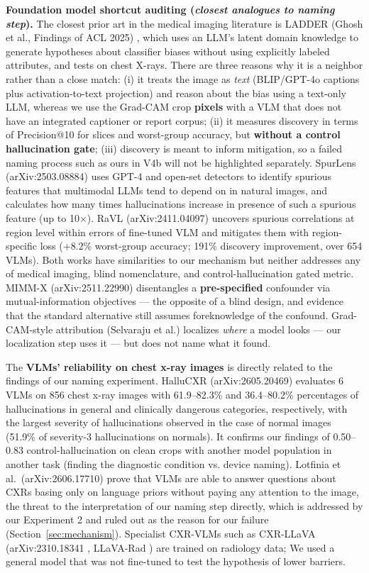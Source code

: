 \documentclass{ieeeaccess}
\begin{document}
\textbf{Foundation model shortcut auditing (\textit{closest analogues to naming step}).} The closest prior art in the medical imaging literature is LADDER (Ghosh et al., Findings of ACL 2025) \cite{ladder}, which uses an LLM's latent domain knowledge to generate hypotheses about classifier biases without using explicitly labeled attributes, and tests on chest X-rays. There are three reasons why it is a neighbor rather than a close match: (i) it treats the image as \emph{text} (BLIP/GPT-4o captions plus activation-to-text projection) and reason about the bias using a text-only LLM, whereas we use the Grad-CAM crop \textbf{pixels} with a VLM that does not have an integrated captioner or report corpus; (ii) it measures discovery in terms of Precision@10 for slices and worst-group accuracy, but \textbf{without a control hallucination gate}; (iii) discovery is meant to inform mitigation, so a failed naming process such as ours in V4b will not be highlighted separately. SpurLens (arXiv:2503.08884) \cite{spurlens} uses GPT-4 and open-set detectors to identify spurious features that multimodal LLMs tend to depend on in natural images, and calculates how many times hallucinations increase in presence of such a spurious feature (up to 10$\times$). RaVL (arXiv:2411.04097) \cite{ravl} uncovers spurious correlations at region level within errors of fine-tuned VLM and mitigates them with region-specific loss ($+8.2\%$ worst-group accuracy; 191\% discovery improvement, over 654 VLMs). Both works have similarities to our mechanism but neither addresses any of medical imaging, blind nomenclature, and control-hallucination gated metric. MIMM-X (arXiv:2511.22990) \cite{mimmx} disentangles a \textbf{pre-specified} confounder via mutual-information objectives --- the opposite of a blind design, and evidence that the standard alternative still assumes foreknowledge of the confound. Grad-CAM-style attribution (Selvaraju et al.) \cite{gradcam} localizes \emph{where} a model looks --- our localization step uses it --- but does not name what it found.

The \textbf{VLMs' reliability on chest x-ray images} is directly related to the findings of our naming experiment. HalluCXR (arXiv:2605.20469) \cite{hallucxr} evaluates 6 VLMs on 856 chest x-ray images with 61.9--82.3\% and 36.4--80.2\% percentages of hallucinations in general and clinically dangerous categories, respectively, with the largest severity of hallucinations observed in the case of normal images (51.9\% of severity-3 hallucinations on normals). It confirms our findings of 0.50--0.83 control-hallucination on clean crops with another model population in another task (finding the diagnostic condition vs. device naming). Lotfinia et al.\ (arXiv:2606.17710) \cite{lotfinia2026} prove that VLMs are able to answer questions about CXRs basing only on language priors without paying any attention to the image, the threat to the interpretation of our naming step directly, which is addressed by our Experiment 2 and ruled out as the reason for our failure (Section~\ref{sec:mechanism}). Specialist CXR-VLMs such as CXR-LLaVA (arXiv:2310.18341 \cite{cxrllava}, LLaVA-Rad \cite{llavarad}) are trained on radiology data; We used a general model that was not fine-tuned to test the hypothesis of lower barriers.
\end{document}
